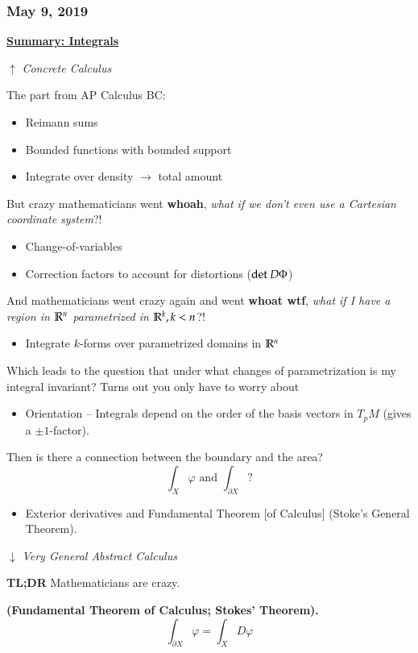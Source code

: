 \subsubsection*{May 9, 2019}

\ul{\textbf{Summary: Integrals}}

$\uparrow$ \emph{Concrete Calculus}

The part from AP Calculus BC: 
\begin{itemize}
	\item Reimann sums
	\item Bounded functions with bounded support
	\item Integrate over density $\rightarrow$ total amount
\end{itemize}
But crazy mathematicians went \textbf{whoah}, \emph{what if we don't even use a Cartesian coordinate system}?! 
\begin{itemize}
	\item Change-of-variables
	\item Correction factors to account for distortions ($\mathrm{det}\ D\Phi$)
\end{itemize} 
And mathematicians went crazy again and went \textbf{whoat wtf}, \emph{what if I have a region in $\mathbb{R}^n$ parametrized in $\mathbb{R}^k, k<n$}?!
\begin{itemize}
	\item Integrate $k$-forms over parametrized domains in $\mathbb{R}^n$
\end{itemize}
Which leads to the question that under what changes of parametrization is my integral invariant? Turns out you only have to worry about
\begin{itemize}
	\item Orientation -- Integrals depend on the order of the basis vectors in $T_pM$ (gives a $\pm 1$-factor). 
\end{itemize}
Then is there a connection between the boundary and the area? 
\[\int_X \varphi \text{ and } \int_{\partial X} ?\]
\begin{itemize}
	\item Exterior derivatives and Fundamental Theorem [of Calculus] (Stoke's General Theorem). 
\end{itemize}
$\downarrow$ \emph{Very General Abstract Calculus}

\textbf{TL;DR} Mathematicians are crazy. 

\begin{theorem}
	\textbf{(Fundamental Theorem of Calculus; Stokes' Theorem).} 
	\begin{equation}
		\int_{\partial X} \varphi = \int_{X} D\varphi
	\end{equation}
\end{theorem}


